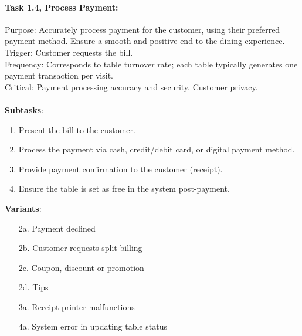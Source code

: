 \documentclass{article}
\begin{document}
\paragraph{Task 1.4, Process Payment:}
Purpose: Accurately process payment for the customer, using their preferred payment method. Ensure a smooth and positive end to the dining experience.
Trigger: Customer requests the bill.\\
Frequency: Corresponds to table turnover rate; each table typically generates one payment transaction per visit.\\
Critical: Payment processing accuracy and security. Customer privacy.\\
\\
\textbf{Subtasks}:
\begin{enumerate}
    \item Present the bill to the customer.
    \item Process the payment via cash, credit/debit card, or digital payment method.
    \item Provide payment confirmation to the customer (receipt).
    \item Ensure the table is set as free in the system post-payment.
\end{enumerate}
\textbf{Variants}:
\begin{enumerate}
    \item [2a.] Payment declined
    \item [2b.] Customer requests split billing
    \item [2c.] Coupon, discount or promotion
    \item [2d.] Tips
    \item [3a.] Receipt printer malfunctions
    \item [4a.] System error in updating table status
\end{enumerate}
\end{document}
